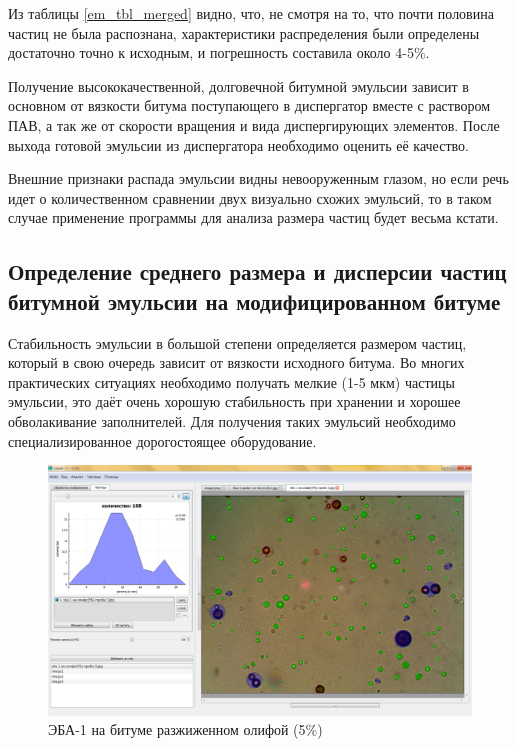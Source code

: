 Из таблицы \ref{em_tbl_merged} видно, что, не смотря на то, что почти половина частиц не была распознана, характеристики распределения были определены достаточно точно к исходным, и погрешность составила около 4-5\%.

Получение высококачественной, долговечной битумной эмульсии зависит в основном от вязкости битума поступающего в диспергатор вместе с раствором ПАВ, а так же от скорости вращения и вида диспергирующих элементов. После выхода готовой эмульсии из диспергатора необходимо оценить её качество. 

Внешние признаки распада эмульсии видны невооруженным глазом, но если речь идет о количественном  сравнении двух визуально схожих эмульсий, то в таком случае применение программы для анализа размера частиц будет весьма кстати. 

\subsection{Определение среднего размера и дисперсии частиц битумной эмульсии на модифицированном битуме}

Стабильность эмульсии в большой степени определяется размером частиц, который в свою очередь зависит от вязкости исходного битума. Во многих практических ситуациях необходимо получать мелкие (1-5 мкм) частицы эмульсии, это даёт очень хорошую стабильность при хранении и хорошее обволакивание заполнителей. Для получения таких эмульсий необходимо специализированное дорогостоящее оборудование. 

\begin{figure}[h]
	\centering
	\includegraphics[scale=0.75]{images/em_05}
	\caption{ЭБА-1 на битуме разжиженном олифой (5\%)}
	\label{em_img_01}
\end{figure}

